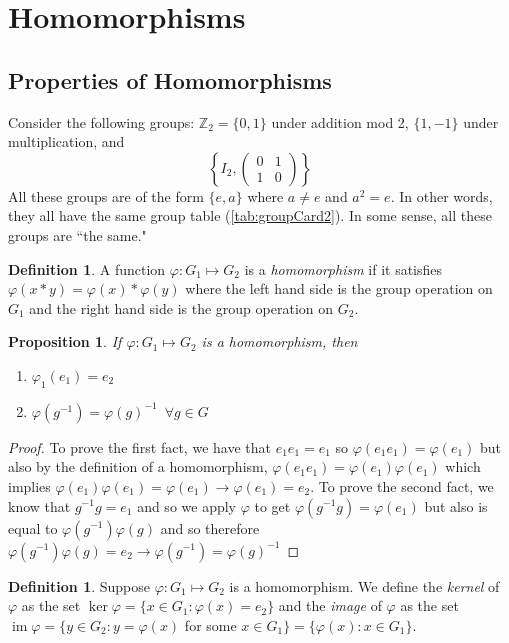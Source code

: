 \documentclass{article}
\newcommand{\Z}{\mathbb{Z}}
\DeclareMathOperator{\im}{im}
\newtheorem{proposition}[theorem]{Proposition}
\theoremstyle{definition}
\newtheorem{definition}[theorem]{Definition}
\begin{document}
\section{Homomorphisms}
\subsection{Properties of Homomorphisms}
Consider the following groups: $\Z_2=\{0,1\}$ under addition mod 2, $\{1,-1\}$ under multiplication, and  
\begin{equation*}
    \left\{ I_2,\begin{pmatrix}
        0&1\\1&0
    \end{pmatrix} \right\}
\end{equation*}
All these groups are of the form $\{e,a\}$ where $a\neq e$ and $a^2=e$. In other words, they all have the same group table (\ref{tab:groupCard2}). In some sense, all these groups are ``the same." 
\begin{definition}
    A function $\varphi:G_1 \mapsto G_2$ is a \emph{homomorphism} if it satisfies $\varphi(x*y)=\varphi(x)*\varphi(y)$ where the left hand side is the group operation on $G_1$ and the right hand side is the group operation on $G_2$.
\end{definition}

\begin{proposition}
    If $\varphi : G_1\mapsto G_2$ is a homomorphism, then 
    \begin{enumerate}
        \item $\varphi_1(e_1)=e_2$
        \item $\varphi(g^{-1})=\varphi (g)^{-1} \,\,\, \forall g\in G$
    \end{enumerate}
\end{proposition}
\begin{proof}
    To prove the first fact, we have that $e_1e_1=e_1$ so $\varphi (e_1e_1)=\varphi(e_1)$ but also by the definition of a homomorphism, $\varphi (e_1e_1) = \varphi(e_1)\varphi(e_1)$ which implies $\varphi(e_1)\varphi(e_1)=\varphi(e_1) \rightarrow \varphi(e_1)=e_2$. To prove the second fact, we know that $g^{-1}g=e_1$ and so we apply $\varphi$ to get $\varphi(g^{-1}g)=\varphi(e_1)$ but also is equal to $\varphi(g^{-1})\varphi(g)$ and so therefore $\varphi(g^{-1})\varphi(g)=e_2\rightarrow \varphi(g^{-1})=\varphi(g)^{-1}$  
\end{proof}
\begin{definition}
    Suppose $\varphi: G_1 \mapsto G_2$ is a homomorphism. We define the \emph{kernel} of $\varphi$ as the set $\ker \varphi= \{x\in G_1: \varphi(x)=e_2\}$ and the \emph{image} of $\varphi$ as the set $\im \varphi = \{y\in G_2:y=\varphi(x)$ for some $x\in G_1\}=\{\varphi(x):x\in G_1\}$.
\end{definition}
\end{document}
